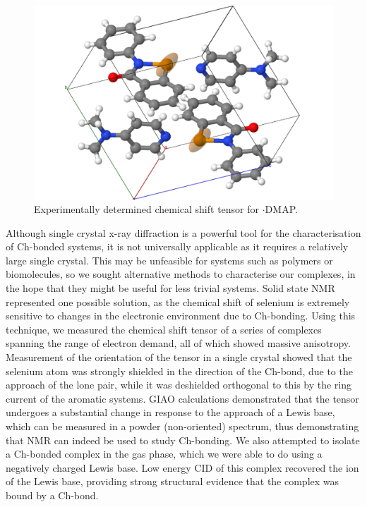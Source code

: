 \begin{refsection}
\begin{figure}
\centering
\includegraphics[width=0.7\linewidth]{Figures/expt-tensor-ebs-dmap.pdf}
\caption{Experimentally determined chemical shift tensor for $ \cdot $DMAP.}
\end{figure}

Although single crystal x-ray diffraction is a powerful tool for the characterisation of Ch-bonded systems, it is not universally applicable as it requires a relatively large single crystal.
This may be unfeasible for systems such as polymers or biomolecules, so we sought alternative methods to characterise our complexes, in the hope that they might be useful for less trivial systems.
Solid state NMR represented one possible solution, as the chemical shift of selenium is extremely sensitive to changes in the electronic environment due to Ch-bonding.
Using this technique, we measured the chemical shift tensor of a series of complexes spanning the range of electron demand, all of which showed massive anisotropy.
Measurement of the orientation of the tensor in a single crystal showed that the selenium atom was strongly shielded in the direction of the Ch-bond, due to the approach of the lone pair, while it was deshielded orthogonal to this by the ring current of the aromatic systems.
GIAO calculations demonstrated that the tensor undergoes a substantial change in response to the approach of a Lewis base, which can be measured in a powder (non-oriented) spectrum, thus demonstrating that NMR can indeed be used to study Ch-bonding.
We also attempted to isolate a Ch-bonded complex in the gas phase, which we were able to do using a negatively charged Lewis base.
Low energy CID of this complex recovered the ion of the Lewis base, providing strong structural evidence that the complex was bound by a Ch-bond.


\end{refsection}
